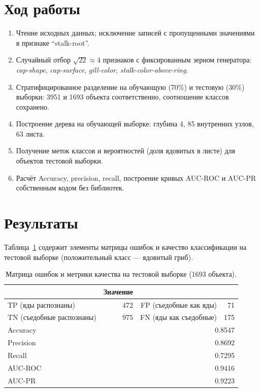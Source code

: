 \documentclass[12pt,a4paper]{article}
\begin{document}
\section{Ход работы}
\begin{enumerate}
\item Чтение исходных данных; исключение записей с пропущенными значениями в признаке ``stalk-root''.
\item Случайный отбор $\sqrt{22} \approx 4$ признаков с фиксированным зерном генератора: \emph{cap-shape}, \emph{cap-surface}, \emph{gill-color}, \emph{stalk-color-above-ring}.
\item Стратифицированное разделение на обучающую (70\%) и тестовую (30\%) выборки: 3951 и 1693 объекта соответственно, соотношение классов сохранено.
\item Построение дерева на обучающей выборке: глубина 4, 85 внутренних узлов, 63 листа.
\item Получение меток классов и вероятностей (доля ядовитых в листе) для объектов тестовой выборки.
\item Расчёт Accuracy, precision, recall, построение кривых AUC-ROC и AUC-PR собственным кодом без библиотек.
\end{enumerate}

\section{Результаты}
Таблица~\ref{tab:metrics} содержит элементы матрицы ошибок и качество классификации на тестовой выборке (положительный класс --- ядовитый гриб).

\begin{table}[H]
\centering
\caption{Матрица ошибок и метрики качества на тестовой выборке (1693 объекта).}
\label{tab:metrics}
\begin{tabular}{lrrr}
\toprule
 & Значение & & \\
\hline
TP (яды распознаны) & 472 & FP (съедобные как яды) & 71 \\
TN (съедобные распознаны) & 975 & FN (яды как съедобные) & 175 \\
\midrule
Accuracy & \multicolumn{3}{r}{0.8547} \\
Precision & \multicolumn{3}{r}{0.8692} \\
Recall & \multicolumn{3}{r}{0.7295} \\
AUC-ROC & \multicolumn{3}{r}{0.9416} \\
AUC-PR & \multicolumn{3}{r}{0.9223} \\
\bottomrule
\end{tabular}
\end{table}
\end{document}
